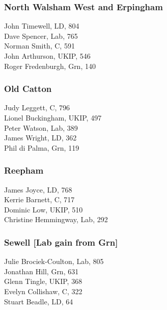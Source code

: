 \documentclass[a4paper,openany,10pt]{book}
\begin{document}
\subsubsection*{North Walsham West and Erpingham}



John Timewell, LD, 804\\
Dave Spencer, Lab, 765\\
Norman Smith, C, 591\\
John Arthurson, UKIP, 546\\
Roger Fredenburgh, Grn, 140\\


\subsubsection*{Old Catton}



Judy Leggett, C, 796\\
Lionel Buckingham, UKIP, 497\\
Peter Watson, Lab, 389\\
James Wright, LD, 362\\
Phil di Palma, Grn, 119\\


\subsubsection*{Reepham}



James Joyce, LD, 768\\
Kerrie Barnett, C, 717\\
Dominic Low, UKIP, 510\\
Christine Hemmingway, Lab, 292\\


\subsubsection*{Sewell \hspace*{\fill}\nolinebreak[1]%
\enspace\hspace*{\fill}
[Lab gain from Grn]}



Julie Brociek-Coulton, Lab, 805\\
Jonathan Hill, Grn, 631\\
Glenn Tingle, UKIP, 368\\
Evelyn Collishaw, C, 322\\
Stuart Beadle, LD, 64\\
\end{document}

